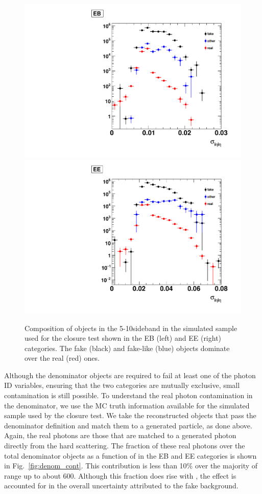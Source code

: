 \begin{figure}[!htbp]
  \centering
  \includegraphics[scale=0.40]{figures/sieie_sideband_EB.pdf}
  \includegraphics[scale=0.40]{figures/sieie_sideband_EE.pdf}
  \caption{Composition of objects in the 5-10\GeV sideband in the simulated sample used for the closure test shown in the EB (left) and EE (right) categories. The fake (black) and fake-like (blue) objects dominate over the real (red) ones.}
  \label{fig:sideband_cont}
\end{figure}

Although the denominator objects are required to fail at least one of the photon ID variables, ensuring that the two categories are mutually exclusive, small contamination is still possible. To understand the real photon contamination in the denominator, we use the MC truth information available for the simulated sample used by the closure test. We take the reconstructed objects that pass the denominator definition and match them to a generated particle, as done above. Again, the real photons are those that are matched to a generated photon directly from the hard scattering. The fraction of these real photons over the total denominator objects as a function of \pt in the EB and EE categories is shown in Fig.~\ref{fig:denom_cont}. This contribution is less than 10\% over the majority of \pt range up to about 600\GeV. Although this fraction does rise with \pt, the effect is accounted for in the overall uncertainty attributed to the fake background.

